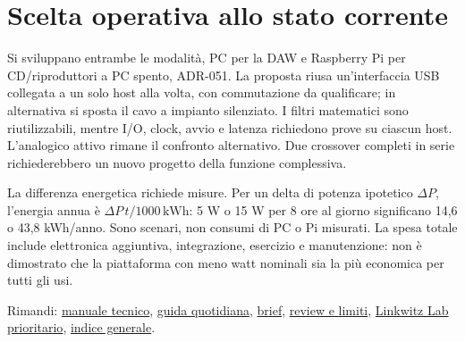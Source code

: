 \documentclass[
  italian,
  11pt,
  a4paper,
]{article}
\begin{document}
\section{Scelta operativa allo stato corrente}\label{scelta-operativa-allo-stato-corrente}

Si sviluppano entrambe le modalità, PC per la DAW e Raspberry Pi per CD/riproduttori a PC
spento, ADR-051. La proposta riusa un'interfaccia USB collegata a un solo host alla volta,
con commutazione da qualificare; in alternativa si sposta il cavo a impianto silenziato. I
filtri matematici sono riutilizzabili, mentre I/O, clock, avvio e latenza richiedono prove
su ciascun host. L'analogico attivo rimane il confronto alternativo. Due crossover completi
in serie richiederebbero un nuovo progetto della funzione complessiva.

La differenza energetica richiede misure. Per un delta di potenza ipotetico \(\Delta P\),
l'energia annua è \(\Delta P\,t/1000\,\mathrm{kWh}\): 5 W o 15 W per 8 ore al giorno
significano 14,6 o 43,8 kWh/anno. Sono scenari, non consumi di PC o Pi misurati. La spesa
totale include elettronica aggiuntiva, integrazione, esercizio e manutenzione: non è
dimostrato che la piattaforma con meno watt nominali sia la più economica per tutti gli usi.

Rimandi: \href{../../docs/61-camilladsp-manuale-tecnico.md}{manuale tecnico},
\href{../../docs/10-ambiente/camilladsp-uso-quotidiano.md}{guida quotidiana},
\href{../../research-vault/crossover-pc-pi-analogico/brief.md}{brief},
\href{../../research-vault/crossover-pc-pi-analogico/review.md}{review e limiti},
\href{../../research-vault/web/linkwitzlab-active-filters.md}{Linkwitz Lab prioritario},
\href{../../docs/INDICE-RAGIONATO.md}{indice generale}.
\end{document}
